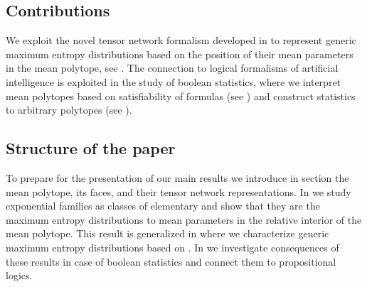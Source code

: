 
\subsection{Contributions}

We exploit the novel tensor network formalism developed in \cite{goessmann_tensor_2026} to represent generic maximum entropy distributions based on the position of their mean parameters in the mean polytope, see .
The connection to logical formalisms of artificial intelligence is exploited in the study of boolean statistics, where we interpret mean polytopes based on satisfiability of formulas (see ) and construct statistics to arbitrary polytopes (see ).

\subsection{Structure of the paper}

To prepare for the presentation of our main results we introduce in section  the mean polytope, its faces, and their tensor network representations.
In  we study exponential families as classes of elementary \ComputationActivationNetworks{} and show that they are the maximum entropy distributions to mean parameters in the relative interior of the mean polytope.
This result is generalized in  where we characterize generic maximum entropy distributions based on \ComputationActivationNetworks{}.
In  we investigate consequences of these results in case of boolean statistics and connect them to propositional logics.
